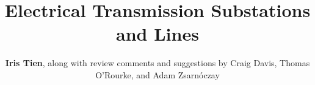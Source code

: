 %
%
%


%
%
%
%
%
%
%
%

\title{Electrical Transmission Substations and Lines}
\author{
    \textbf{Iris Tien},
    \newline
    along with review comments and suggestions by Craig Davis, Thomas O'Rourke, and Adam Zsarnóczay
}
\tocauthor{}
%
%
\maketitle
\label{chapter:perf_power}

